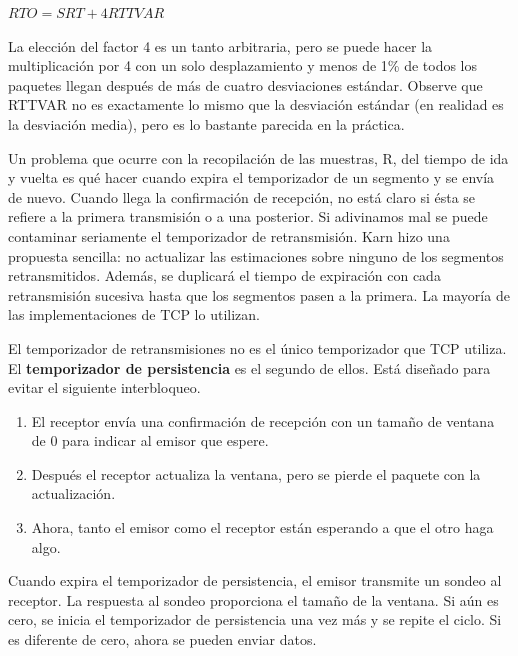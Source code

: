 \documentclass[10pt,a4paper]{report}
\begin{document}
	\begin{center}
		$ RTO = SRT + 4 RTTVAR $
	\end{center}

\par La elección del factor 4 es un tanto arbitraria, pero se puede hacer la multiplicación por 4 con un solo desplazamiento y menos de 1\% de todos los paquetes llegan después de más de cuatro desviaciones estándar. Observe que RTTVAR no es exactamente lo mismo que la desviación estándar (en realidad es la desviación media), pero es lo bastante parecida en la práctica.	
	
	\par Un problema que ocurre con la recopilación de las muestras, R, del tiempo de ida y 
	vuelta es qué hacer cuando expira el temporizador de un segmento y se envía de 
	nuevo. Cuando llega la confirmación de recepción, no está claro si ésta se refiere a la 
	primera transmisión o a una posterior. Si adivinamos mal se puede contaminar 
	seriamente el temporizador de retransmisión. Karn hizo una propuesta sencilla: no 
	actualizar las estimaciones sobre ninguno de los segmentos retransmitidos. Además, se 
	duplicará el tiempo de expiración con cada retransmisión sucesiva hasta que los 
	segmentos pasen a la primera. La mayoría de las implementaciones de TCP lo utilizan.
	
	\par El temporizador de retransmisiones no es el único temporizador que TCP utiliza. El \textbf{temporizador de persistencia} es el segundo de ellos. Está diseñado para evitar el siguiente interbloqueo.
	\begin{enumerate}
		\item  El receptor envía una confirmación de recepción con un tamaño de ventana de 0 para indicar al emisor que espere.
		\item Después el receptor actualiza la ventana, pero se pierde el paquete con la actualización.
		\item Ahora, tanto el emisor como el receptor están esperando a que el otro haga algo.
	\end{enumerate}	
	
	\par Cuando expira el temporizador de persistencia, el emisor transmite un sondeo al receptor. La respuesta al sondeo proporciona el tamaño de la ventana. Si aún es cero, se inicia el temporizador de persistencia una vez más y se repite el ciclo. Si es diferente de cero, ahora se pueden enviar datos.
\end{document}
